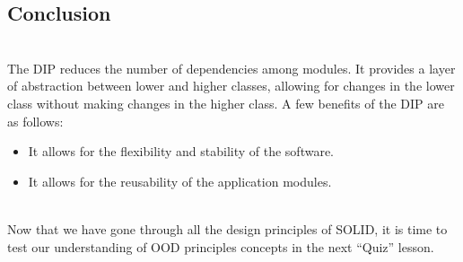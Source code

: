 \subsection{Conclusion}\label{NCqzHMVbCCogrm0e3M0Nx}
\\
The DIP reduces the number of dependencies among modules. It provides a layer of abstraction between lower and higher classes, allowing for changes in the lower class without making changes in the higher class. A few benefits of the DIP are as follows:

\begin{itemize}
\item
\protect{}\label{rs2tmRHls9mqOuZj_559n}
It allows for the flexibility and stability of the software.
\item
\protect{}\label{fAQpTNrTr6dY-eXJM7r-E}
It allows for the reusability of the application modules.
\end{itemize}
\\
Now that we have gone through all the design principles of SOLID, it is time to test our understanding of OOD principles concepts in the next ``Quiz'' lesson.

